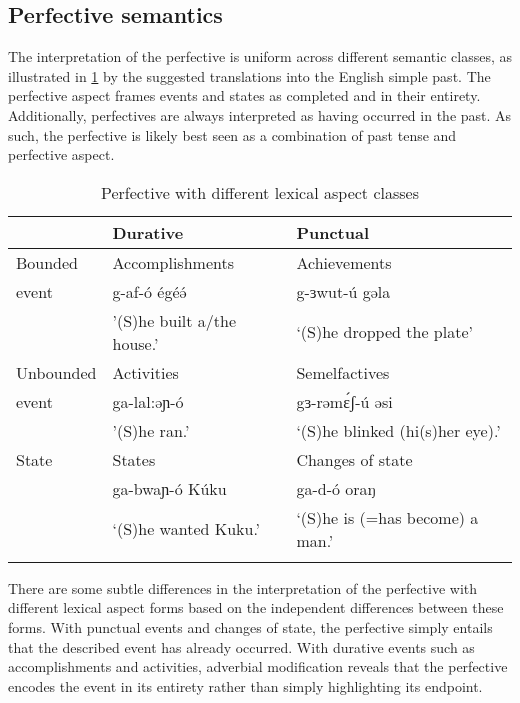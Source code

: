 
\subsection{Perfective semantics}\label{sec:ch11:perfectivesem}

The interpretation of the perfective is uniform across different semantic classes, as illustrated in \ref{tab:ch11:pfvasp} by the suggested translations into the English simple past. The perfective aspect frames events and states as completed and in their entirety. Additionally, perfectives are always interpreted as having occurred in the past. As such, the perfective is likely best seen as a combination of past tense and perfective aspect.

\begin{table}
\begin{tabular}{lll}
\lsptoprule
			&	Durative 				&	Punctual \\
			\midrule 
Bounded		&	Accomplishments 		&	Achievements\\
event		&  g-af-ó égéə́   				&	g-ɜwut-ú gəla \\ 
			& '(S)he built a/the house.' 	& `(S)he dropped the plate'\\
\midrule
Unbounded	&  Activities				& 	Semelfactives \\
event			&  ga-lal:əɲ-ó			&	gɜ-rəmɛ́ʃ-ú əsi \\ 
			& '(S)he ran.' 					&  `(S)he blinked (hi(s)her eye).'\\
\midrule 
State		&  States 					&  Changes of state\\
			& ga-bwaɲ-ó Kúku			& ga-d-ó oraŋ\\
			& 	`(S)he wanted Kuku.'			& `(S)he is (=has become) a man.' \\%
\lspbottomrule
\end{tabular}	
\caption{Perfective with different lexical aspect classes}\label{tab:ch11:pfvasp}
\end{table}

There are some subtle differences in the interpretation of the perfective with different lexical aspect forms based on the independent differences between these forms. With punctual events and changes of state, the perfective simply entails that the described event has already occurred. With  durative events such as accomplishments and activities, adverbial modification reveals that the perfective encodes the event in its entirety rather than simply highlighting its endpoint.


